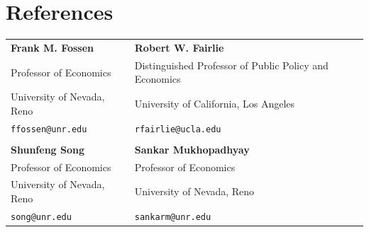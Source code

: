 \documentclass[12pt,letterpaper]{report}
\begin{document}
    \section*{References}
    \noindent
\begin{tabular}{p{6.2cm} p{7.8cm}}
    \textbf{Frank M. Fossen} & \textbf{Robert W. Fairlie} \\
    Professor of Economics & Distinguished Professor of Public Policy and Economics \\
    University of Nevada, Reno & University of California, Los Angeles\\
    \texttt{ffossen@unr.edu} & \texttt{rfairlie@ucla.edu} \\
    \\
    \textbf{Shunfeng Song} & \textbf{Sankar Mukhopadhyay} \\
    Professor of Economics & Professor of Economics \\
    University of Nevada, Reno & University of Nevada, Reno \\
    \texttt{song@unr.edu} & \texttt{sankarm@unr.edu} \\
\end{tabular}
\end{document}
